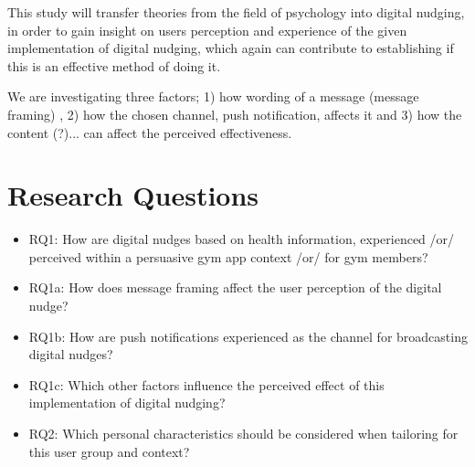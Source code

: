
This study will transfer theories from the field of psychology into digital nudging, in order to gain insight on users perception and experience of the given implementation of digital nudging, which again can contribute to establishing if this is an effective method of doing it. 

We are investigating three factors; 1) how wording of a message (message framing) , 2) how the chosen channel, push notification, affects it and 3) how the content (?)... can affect the perceived effectiveness. 




\section{Research Questions}
\begin{itemize}
\item RQ1: How are digital nudges based on health information, experienced /or/ perceived within a persuasive gym app context /or/ for gym members?
\end{itemize}
\begin{itemize}
\item RQ1a: How does message framing affect the user perception of the digital nudge?
\item RQ1b: How are push notifications experienced as the channel for broadcasting digital nudges?
\item RQ1c: Which other factors influence the perceived effect of this implementation of digital nudging?
\item RQ2: Which personal characteristics should be considered when tailoring for this user group and context?
\end{itemize}

